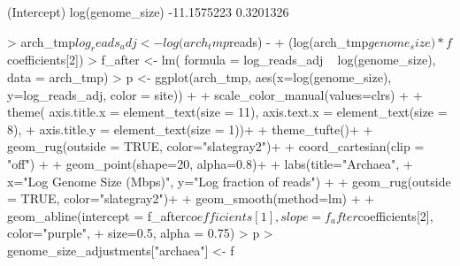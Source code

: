 \documentclass{article}
\begin{document}
\begin{Schunk}
\begin{Soutput}
     (Intercept) log(genome_size) 
     -11.1575223        0.3201326 
\end{Soutput}
\begin{Sinput}
> arch_tmp$log_reads_adj <- log(arch_tmp$reads) - 
+               (log(arch_tmp$genome_size)*f$coefficients[2])
> f_after <- lm( formula = log_reads_adj ~ log(genome_size), data = arch_tmp)
> p <- ggplot(arch_tmp, aes(x=log(genome_size), y=log_reads_adj, color = site)) +
+   scale_color_manual(values=clrs) +
+   theme( axis.title.x = element_text(size = 11), axis.text.x = element_text(size = 8),
+            axis.title.y = element_text(size = 1))+
+   theme_tufte()+
+   geom_rug(outside = TRUE, color="slategray2")+ 
+   coord_cartesian(clip = "off") +
+   geom_point(shape=20, alpha=0.8)+
+   labs(title="Archaea", 
+       x="Log Genome Size (Mbps)", y="Log fraction of reads") +
+   geom_rug(outside = TRUE, color="slategray2")+ 
+   geom_smooth(method=lm)  +
+   geom_abline(intercept = f_after$coefficients[1], slope = f_after$coefficients[2], color="purple", 
+                   size=0.5, alpha = 0.75)
> p
> genome_size_adjustments["archaea"] <- f
\end{Sinput}
\end{Schunk}
\end{document}
